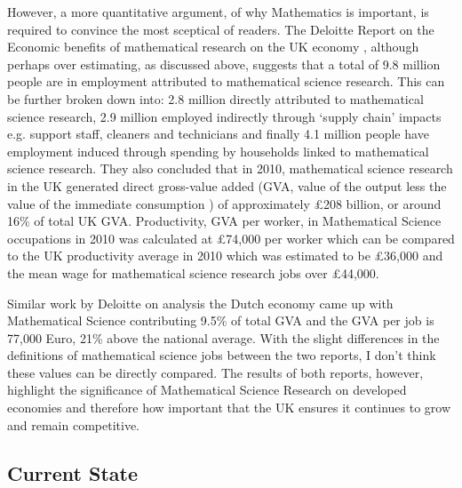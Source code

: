 \documentclass[11pt]{article} %
\begin{document}
However, a more quantitative argument, of why Mathematics is important, is required to convince the most sceptical of readers. The Deloitte Report on the Economic benefits of mathematical research on the UK economy \cite{deloitteuk}, although perhaps over estimating, as discussed above, suggests that a total of 9.8 million people are in employment attributed to mathematical science research. This can be further broken down into: 2.8 million  directly attributed to mathematical science research, 2.9 million employed indirectly through `supply chain' impacts e.g. support staff, cleaners and technicians and finally 4.1 million people have employment induced  through spending by households linked to mathematical science research. They also concluded that in 2010, mathematical science research in the UK generated direct gross-value added (GVA, value of the output less the value of the immediate consumption ) of approximately £208 billion, or around 16\% of total UK GVA.  Productivity, GVA per worker, in Mathematical Science occupations in 2010 was calculated at £74,000 per worker which can be compared to the UK productivity average in 2010 which was estimated to be £36,000 and the mean wage for mathematical science research jobs over £44,000. 
 
 Similar work by Deloitte on analysis the Dutch economy \cite{deloitteNL} came up with Mathematical Science contributing 9.5\% of total GVA and the GVA per job is 77,000 Euro, 21\% above the national average. With the slight differences in the  definitions of mathematical science jobs between the two reports, I don't think these values can be directly compared. The results of both reports, however,  highlight the significance of Mathematical Science Research on developed economies and therefore how important that the UK ensures it continues to grow and remain competitive.
 
 
	
	 
	\subsection{Current State \label{current state }}
	
\end{document}
